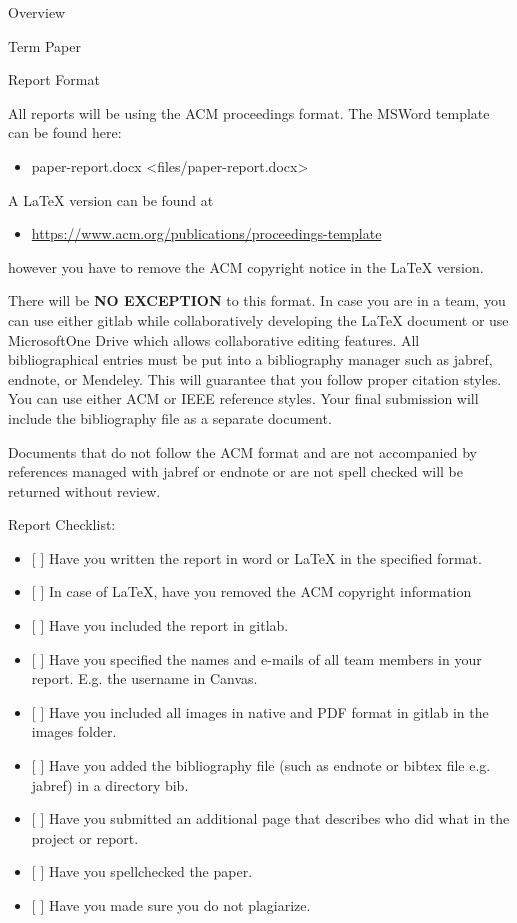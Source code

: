 \begin{edXchapter}{Overview}
\begin{edXsection}{Term Paper}
\end{edXsection}
\begin{edXsection}{Report Format}\label{report-format}

All reports will be using the ACM proceedings format. The MSWord
template can be found here:

\begin{itemize}
\itemsep1pt\parskip0pt
\item
  paper-report.docx \textless{}files/paper-report.docx\textgreater{}
\end{itemize}

A LaTeX version can be found at

\begin{itemize}
\itemsep1pt\parskip0pt
\item
  \url{https://www.acm.org/publications/proceedings-template}
\end{itemize}

however you have to remove the ACM copyright notice in the LaTeX
version.

There will be \textbf{NO EXCEPTION} to this format. In case you are in a
team, you can use either gitlab while collaboratively developing the
LaTeX document or use MicrosoftOne Drive which allows collaborative
editing features. All bibliographical entries must be put into a
bibliography manager such as jabref, endnote, or Mendeley. This will
guarantee that you follow proper citation styles. You can use either ACM
or IEEE reference styles. Your final submission will include the
bibliography file as a separate document.

Documents that do not follow the ACM format and are not accompanied by
references managed with jabref or endnote or are not spell checked will
be returned without review.

Report Checklist:

\begin{itemize}
\itemsep1pt\parskip0pt
\item
  {[} {]} Have you written the report in word or LaTeX in the specified
  format.
\item
  {[} {]} In case of LaTeX, have you removed the ACM copyright
  information
\item
  {[} {]} Have you included the report in gitlab.
\item
  {[} {]} Have you specified the names and e-mails of all team members
  in your report. E.g. the username in Canvas.
\item
  {[} {]} Have you included all images in native and PDF format in
  gitlab in the images folder.
\item
  {[} {]} Have you added the bibliography file (such as endnote or
  bibtex file e.g. jabref) in a directory bib.
\item
  {[} {]} Have you submitted an additional page that describes who did
  what in the project or report.
\item
  {[} {]} Have you spellchecked the paper.
\item
  {[} {]} Have you made sure you do not plagiarize.
\end{itemize}


\end{edXsection}
\end{edXchapter}
